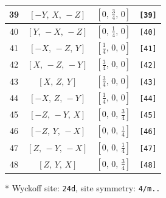\documentclass[fleqn,8pt]{jsarticle}
\begin{document}
\begin{longtable}{cccc}
39 & $\left[ - Y,\, X,\, - Z \right]$ & $\left[ 0,\, \frac{3}{4},\, 0 \right]$ & {\tt [39]} \\ \hline
40 & $\left[ Y,\, - X,\, - Z \right]$ & $\left[ 0,\, \frac{1}{4},\, 0 \right]$ & {\tt [40]} \\ \hline
41 & $\left[ - X,\, - Z,\, Y \right]$ & $\left[ \frac{1}{4},\, 0,\, 0 \right]$ & {\tt [41]} \\ \hline
42 & $\left[ X,\, - Z,\, - Y \right]$ & $\left[ \frac{3}{4},\, 0,\, 0 \right]$ & {\tt [42]} \\ \hline
43 & $\left[ X,\, Z,\, Y \right]$ & $\left[ \frac{3}{4},\, 0,\, 0 \right]$ & {\tt [43]} \\ \hline
44 & $\left[ - X,\, Z,\, - Y \right]$ & $\left[ \frac{1}{4},\, 0,\, 0 \right]$ & {\tt [44]} \\ \hline
45 & $\left[ - Z,\, - Y,\, X \right]$ & $\left[ 0,\, 0,\, \frac{3}{4} \right]$ & {\tt [45]} \\ \hline
46 & $\left[ - Z,\, Y,\, - X \right]$ & $\left[ 0,\, 0,\, \frac{1}{4} \right]$ & {\tt [46]} \\ \hline
47 & $\left[ Z,\, - Y,\, - X \right]$ & $\left[ 0,\, 0,\, \frac{1}{4} \right]$ & {\tt [47]} \\ \hline
48 & $\left[ Z,\, Y,\, X \right]$ & $\left[ 0,\, 0,\, \frac{3}{4} \right]$ & {\tt [48]} \\
\end{longtable}
* Wyckoff site: {\tt 24d}, site symmetry: {\tt 4/m..}
\renewcommand{\arraystretch}{1.2}
\end{document}
